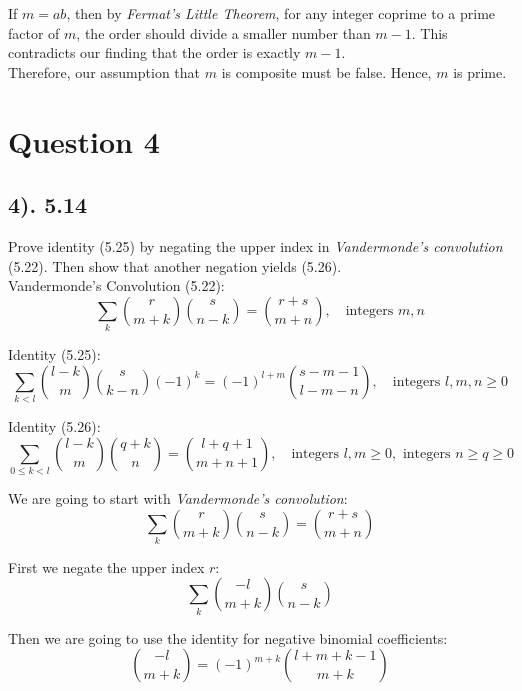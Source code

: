 \documentclass[12pt]{article}
\begin{document}
If $m = ab$, then by \textit{Fermat's Little Theorem}, for any integer coprime to a prime factor of $m$, the order should divide a smaller number than $m-1$.
This contradicts our finding that the order is exactly $m-1$. \\

Therefore, our assumption that $m$ is composite must be false. Hence, $m$ is prime.

\section*{Question 4}
\subsection*{4). 5.14}
Prove identity (5.25) by negating the upper index in \textit{Vandermonde's convolution} (5.22). Then show that another negation yields (5.26). \\

Vandermonde's Convolution (5.22):
\begin{equation}
    \sum_{k} \binom{r}{m+k} \binom{s}{n-k} = \binom{r+s}{m+n}, \quad \text{integers } m, n
\end{equation}

Identity (5.25):
\begin{equation}
    \sum_{k < l} \binom{l-k}{m} \binom{s}{k-n} {(-1)}^k = {(-1)}^{l+m} \binom{s-m-1}{l-m-n}, \quad \text{integers } l, m, n \geq 0
\end{equation}

Identity (5.26):
\begin{equation}
    \sum_{0 \le k < l} \binom{l-k}{m} \binom{q+k}{n} = \binom{l+q+1}{m+n+1}, \quad \text{integers } l, m \geq 0, \text{ integers } n \geq q \geq 0
\end{equation}

We are going to start with \textit{Vandermonde's convolution}:
\begin{equation}
    \sum_{k} \binom{r}{m+k} \binom{s}{n-k} = \binom{r+s}{m+n}
\end{equation}

First we negate the upper index \( r \):
\begin{equation}
    \sum_{k} \binom{-l}{m+k} \binom{s}{n-k}
\end{equation}

Then we are going to use the identity for negative binomial coefficients:
\begin{equation}
    \binom{-l}{m+k} = {(-1)}^{m+k} \binom{l+m+k-1}{m+k}
\end{equation}
\end{document}
